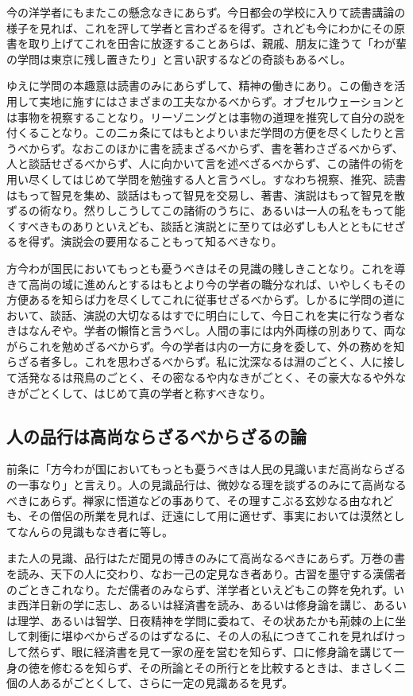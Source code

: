 \documentclass[a4paper, platex, dvipdfmx]{jsarticle}
\begin{document}
今の洋学者にもまたこの懸念なきにあらず。今日都会の学校に入りて読書講論の様子を見れば、これを評して学者と言わざるを得ず。されども今にわかにその原書を取り上げてこれを田舎に放逐することあらば、親戚、朋友に逢うて「わが輩の学問は東京に残し置きたり」と言い訳するなどの奇談もあるべし。

ゆえに学問の本趣意は読書のみにあらずして、精神の働きにあり。この働きを活用して実地に施すにはさまざまの工夫なかるべからず。オブセルウェーションとは事物を視察することなり。リーゾニングとは事物の道理を推究して自分の説を付くることなり。この二ヵ条にてはもとよりいまだ学問の方便を尽くしたりと言うべからず。なおこのほかに書を読まざるべからず、書を著わさざるべからず、人と談話せざるべからず、人に向かいて言を述べざるべからず、この諸件の術を用い尽くしてはじめて学問を勉強する人と言うべし。すなわち視察、推究、読書はもって智見を集め、談話はもって智見を交易し、著書、演説はもって智見を散ずるの術なり。然りしこうしてこの諸術のうちに、あるいは一人の私をもって能くすべきものありといえども、談話と演説とに至りては必ずしも人とともにせざるを得ず。演説会の要用なることもって知るべきなり。

方今わが国民においてもっとも憂うべきはその見識の賤しきことなり。これを導きて高尚の域に進めんとするはもとより今の学者の職分なれば、いやしくもその方便あるを知らば力を尽くしてこれに従事せざるべからず。しかるに学問の道において、談話、演説の大切なるはすでに明白にして、今日これを実に行なう者なきはなんぞや。学者の懶惰と言うべし。人間の事には内外両様の別ありて、両ながらこれを勉めざるべからず。今の学者は内の一方に身を委して、外の務めを知らざる者多し。これを思わざるべからず。私に沈深なるは淵のごとく、人に接して活発なるは飛鳥のごとく、その密なるや内なきがごとく、その豪大なるや外なきがごとくして、はじめて真の学者と称すべきなり。

\subsection{人の品行は高尚ならざるべからざるの論}
前条に「方今わが国においてもっとも憂うべきは人民の見識いまだ高尚ならざるの一事なり」と言えり。人の見識品行は、微妙なる理を談ずるのみにて高尚なるべきにあらず。禅家に悟道などの事ありて、その理すこぶる玄妙なる由なれども、その僧侶の所業を見れば、迂遠にして用に適せず、事実においては漠然としてなんらの見識もなき者に等し。

また人の見識、品行はただ聞見の博きのみにて高尚なるべきにあらず。万巻の書を読み、天下の人に交わり、なお一己の定見なき者あり。古習を墨守する漢儒者のごときこれなり。ただ儒者のみならず、洋学者といえどもこの弊を免れず。いま西洋日新の学に志し、あるいは経済書を読み、あるいは修身論を講じ、あるいは理学、あるいは智学、日夜精神を学問に委ねて、その状あたかも荊棘の上に坐して刺衝に堪ゆべからざるのはずなるに、その人の私につきてこれを見ればけっして然らず、眼に経済書を見て一家の産を営むを知らず、口に修身論を講じて一身の徳を修むるを知らず、その所論とその所行とを比較するときは、まさしく二個の人あるがごとくして、さらに一定の見識あるを見ず。
\end{document}
